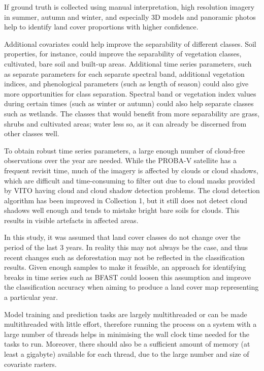 \documentclass[a4paper,10pt]{book}
\begin{document}
If ground truth is collected using manual interpretation, high resolution imagery in summer, autumn and winter, and especially 3D models and panoramic photos help to identify land cover proportions with higher confidence.

Additional covariates could help improve the separability of different classes. Soil properties, for instance, could improve the separability of vegetation classes, cultivated, bare soil and built-up areas. Additional time series parameters, such as separate parameters for each separate spectral band, additional vegetation indices, and phenological parameters (such as length of season) could also give more opportunities for class separation. Spectral band or vegetation index values during certain times (such as winter or autumn) could also help separate classes such as wetlands. The classes that would benefit from more separability are grass, shrubs and cultivated areas; water less so, as it can already be discerned from other classes well.

To obtain robust time series parameters, a large enough number of cloud-free observations over the year are needed. While the PROBA-V satellite has a frequent revisit time, much of the imagery is affected by clouds or cloud shadows, which are difficult and time-consuming to filter out due to cloud masks provided by VITO having cloud and cloud shadow detection problems. The cloud detection algorithm has been improved in Collection 1, but it still does not detect cloud shadows well enough and tends to mistake bright bare soils for clouds. This results in visible artefacts in affected areas.

In this study, it was assumed that land cover classes do not change over the period of the last 3 years. In reality this may not always be the case, and thus recent changes such as deforestation may not be reflected in the classification results. Given enough samples to make it feasible, an approach for identifying breaks in time series such as BFAST \citep{Verbesselt2010bfast} could loosen this assumption and improve the classification accuracy when aiming to produce a land cover map representing a particular year.

Model training and prediction tasks are largely multithreaded or can be made multithreaded with little effort, therefore running the process on a system with a large number of threads helps in minimising the wall clock time needed for the tasks to run. Moreover, there should also be a sufficient amount of memory (at least a gigabyte) available for each thread, due to the large number and size of covariate rasters.
\end{document}
